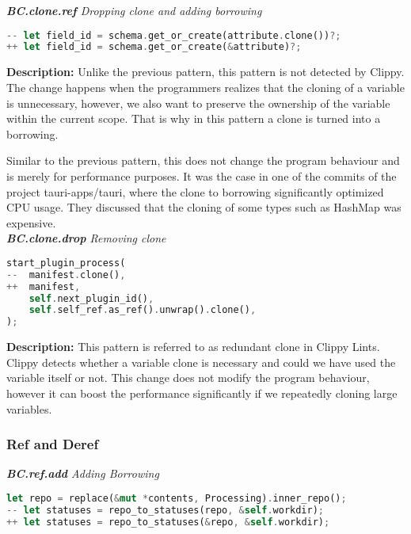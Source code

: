 \noindent \textit{ \textbf{BC.clone.ref} Dropping clone and adding borrowing}

\begin{lstlisting}[language=Rust, style=colouredRust]
-- let field_id = schema.get_or_create(attribute.clone())?;
++ let field_id = schema.get_or_create(&attribute)?;
\end{lstlisting}

\noindent \textbf{Description:} Unlike the previous pattern, this pattern is not detected by Clippy. The change happens when the programmers realizes that the cloning of a variable is unnecessary, however, we also want to preserve the ownership of the variable within the current scope. That is why in this pattern a clone is turned into a borrowing. 

Similar to the previous pattern, this does not change the program behaviour and is merely for performance purposes. It was the case in one of the commits of the project tauri-apps/tauri, where the clone to borrowing significantly optimized CPU usage. They discussed that the cloning of some types such as HashMap was expensive. \\

\noindent \textit{ \textbf{BC.clone.drop} Removing clone}

\begin{lstlisting}[language=Rust, style=colouredRust]
start_plugin_process(
--  manifest.clone(),
++  manifest,
    self.next_plugin_id(),
    self.self_ref.as_ref().unwrap().clone(),
);
\end{lstlisting}

\noindent \textbf{Description:} This pattern is referred to as redundant clone in Clippy Lints. Clippy detects whether a variable clone is necessary and could we have used the variable itself or not. This change does not modify the program behaviour, however it can boost the performance significantly if we repeatedly cloning large variables. 

\subsubsection{Ref and Deref}

\noindent \textit{ \textbf{BC.ref.add} Adding Borrowing}

\begin{lstlisting}[language=Rust, style=colouredRust]
let repo = replace(&mut *contents, Processing).inner_repo();
-- let statuses = repo_to_statuses(repo, &self.workdir);
++ let statuses = repo_to_statuses(&repo, &self.workdir);
\end{lstlisting}

